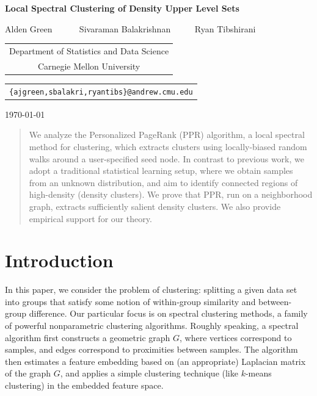 \documentclass[11pt,twoside]{article}
\newcommand{\1}{\mathbf{1}}
\begin{document}
\begin{center} {\Large{\bf{Local Spectral Clustering of Density Upper Level Sets}}}

\vspace*{.3cm}

{\large{
\begin{center}
Alden Green ~~~~~ Sivaraman Balakrishnan~~~~~ Ryan Tibshirani\\
\vspace{.2cm}
\end{center}


\begin{tabular}{c}
Department of Statistics and Data Science \\
Carnegie Mellon University
\end{tabular}

\vspace*{.2in}

\begin{tabular}{c}
\texttt{\{ajgreen,sbalakri,ryantibs\}@andrew.cmu.edu}
\end{tabular}
}}

\vspace*{.2in}

\today
\vspace*{.2in}

\begin{abstract}
\noindent We analyze the Personalized PageRank (PPR) algorithm, a local spectral method for clustering,
which extracts clusters using locally-biased random walks around a user-specified
seed node.  In contrast to previous work, we adopt a traditional statistical
learning setup, where we obtain samples from an unknown distribution, and aim to
identify connected regions of high-density (density clusters).  We prove that
PPR, run on a neighborhood graph, extracts sufficiently salient density
clusters. We also provide empirical support for our theory.
\end{abstract}
\end{center}
\section{Introduction}
\label{sec: introduction}
In this paper, we consider the problem of clustering: splitting a given data set
into groups that satisfy some notion of within-group similarity and
between-group difference.  Our particular focus is on
spectral clustering methods, a family of powerful
nonparametric clustering algorithms. Roughly speaking, a spectral algorithm
first constructs a geometric graph $G$, where vertices correspond to samples,
and edges correspond to proximities between samples. The algorithm 
then estimates a feature
embedding based on (an appropriate) Laplacian matrix of the graph 
$G$, and applies a simple clustering
technique (like $k$-means clustering) in the embedded feature space.
\end{document}
